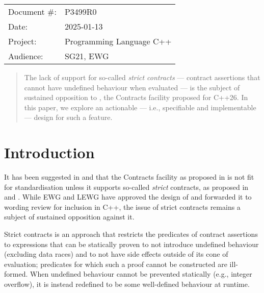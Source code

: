 \begin{tabular}{ll}
Document \#: & P3499R0 \\
Date: &2025-01-13 \\
Project: & Programming Language C++ \\
Audience: & SG21, EWG
\end{tabular}

\begin{abstract}
The lack of support for so-called \emph{strict contracts} --- contract assertions that cannot have undefined behaviour when evaluated --- is the subject of sustained opposition to \cite{P2900R13}, the Contracts facility proposed for C++26. In this paper, we explore an actionable --- i.e., specifiable and implementable --- design for such a feature.
\end{abstract}







\section{Introduction}

It has been suggested in \cite{P3173R0} and \cite{P3362R0} that the Contracts facility as proposed in \cite{P2900R13} is not fit for standardisation unless it supports so-called \emph{strict} contracts, as proposed in \cite{P2680R1} and \cite{P3285R0}. While EWG and LEWG have approved the design of \cite{P2900R13} and forwarded it to wording review for inclusion in C++, the issue of strict contracts remains a subject of sustained opposition against it.

Strict contracts is an approach that restricts the predicates of contract assertions to expressions that can be statically proven to not introduce undefined behaviour (excluding data races) and to not have side effects outside of its cone of evaluation; predicates for which such a proof cannot be constructed are ill-formed. When undefined behaviour cannot be prevented statically (e.g., integer overflow), it is instead redefined to be some well-defined behaviour at runtime.

